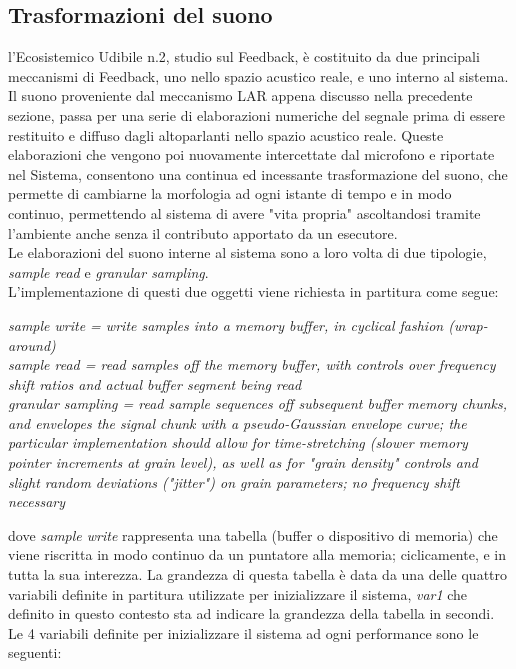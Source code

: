\subsection{Trasformazioni del suono}
\label{sec:Trasformazioni del suono}

l’Ecosistemico Udibile n.2, studio sul Feedback, è costituito
da due principali meccanismi di Feedback, uno nello spazio acustico reale,
e uno interno al sistema. \\
Il suono proveniente dal meccanismo LAR appena discusso nella precedente sezione,
passa per una serie di elaborazioni numeriche del segnale prima di essere restituito
e diffuso dagli altoparlanti nello spazio acustico reale. Queste elaborazioni
che vengono poi nuovamente intercettate dal microfono e riportate nel Sistema,
consentono una continua ed incessante trasformazione del suono, che permette
di cambiarne la morfologia ad ogni istante di tempo e in modo continuo, 
permettendo al sistema di avere "vita propria" ascoltandosi tramite l'ambiente
anche senza il contributo apportato da un esecutore. \\
Le elaborazioni del suono interne al sistema sono a loro volta di due tipologie,
\textit{sample read} e \textit{granular sampling}. \\
L'implementazione di questi due oggetti viene richiesta in partitura come segue:

\begin{center}
    \vspace{0.5cm}
    \textit{sample write = write samples into a memory buffer, in cyclical fashion (wrap-around)} \\
    \textit{sample read = read samples off the memory buffer, with controls over frequency shift ratios and actual buffer segment being read} \\
    \textit{granular sampling = read sample sequences off subsequent buffer memory chunks, and envelopes the signal chunk with a pseudo-Gaussian envelope curve; the particular
    implementation should allow for time-stretching (slower memory pointer increments at grain level), as well as for "grain density" controls and slight random deviations ("jitter") on
    grain parameters; no frequency shift necessary} \\
    \vspace{0.5cm}
\end{center}

dove \textit{sample write} rappresenta una tabella (buffer o dispositivo di memoria) 
che viene riscritta in modo continuo da un puntatore alla memoria;
ciclicamente, e in tutta la sua interezza.
La grandezza di questa tabella è data da una delle quattro variabili definite 
in partitura utilizzate per inizializzare il sistema, \textit{var1} che definito in questo contesto sta ad indicare
la grandezza della tabella in secondi.
Le 4 variabili definite per inizializzare il sistema ad ogni performance sono le seguenti:


